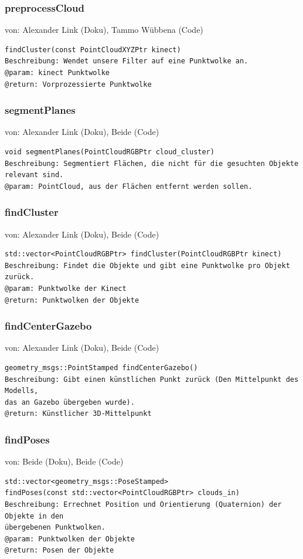 \documentclass{suturo}
\makeatletter
\newcommand{\chapterauthor}[1]{%
  {\parindent0pt\vspace*{-27pt}%
  \linespread{0}\small\begin{flushright}von: #1\end{flushright}%
  \par\nobreak\vspace*{0pt}}
  \@afterheading%
}
\makeatother
\begin{document}
\subsubsection{preprocessCloud}
\chapterauthor{Alexander Link (Doku), Tammo Wübbena (Code)}
\begin{verbatim}
findCluster(const PointCloudXYZPtr kinect)
Beschreibung: Wendet unsere Filter auf eine Punktwolke an.
@param: kinect Punktwolke
@return: Vorprozessierte Punktwolke
\end{verbatim}\label{func:preprocesscloud}

\subsubsection{segmentPlanes}
\chapterauthor{Alexander Link (Doku), Beide (Code)}
\begin{verbatim}
void segmentPlanes(PointCloudRGBPtr cloud_cluster)
Beschreibung: Segmentiert Flächen, die nicht für die gesuchten Objekte
relevant sind.
@param: PointCloud, aus der Flächen entfernt werden sollen.
\end{verbatim}\label{func:segmentplanes}

\subsubsection{findCluster}
\chapterauthor{Alexander Link (Doku), Beide (Code)}
\begin{verbatim}
std::vector<PointCloudRGBPtr> findCluster(PointCloudRGBPtr kinect)
Beschreibung: Findet die Objekte und gibt eine Punktwolke pro Objekt zurück.
@param: Punktwolke der Kinect
@return: Punktwolken der Objekte
\end{verbatim}\label{func:findcluster}

\subsubsection{findCenterGazebo}
\chapterauthor{Alexander Link (Doku), Beide (Code)}
\begin{verbatim}
geometry_msgs::PointStamped findCenterGazebo()
Beschreibung: Gibt einen künstlichen Punkt zurück (Den Mittelpunkt des
Modells, 
das an Gazebo übergeben wurde).
@return: Künstlicher 3D-Mittelpunkt
\end{verbatim}\label{func:findcentergazebo}


\subsubsection{findPoses}
\chapterauthor{Beide (Doku), Beide (Code)}
\begin{verbatim}
std::vector<geometry_msgs::PoseStamped> 
findPoses(const std::vector<PointCloudRGBPtr> clouds_in)
Beschreibung: Errechnet Position und Orientierung (Quaternion) der Objekte in den
übergebenen Punktwolken.
@param: Punktwolken der Objekte
@return: Posen der Objekte
\end{verbatim}\label{func:findposes}
\end{document}

